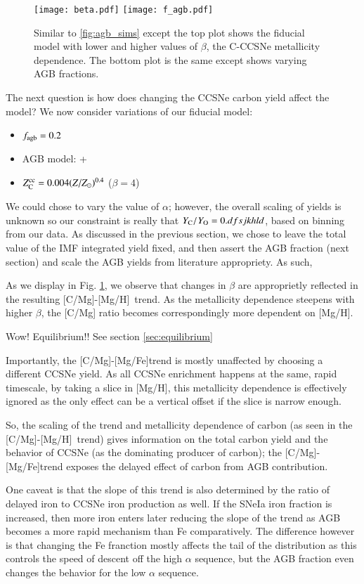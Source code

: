\documentclass[12pt,oneside]{report}
\newcommand{\cristallo}{\citetalias{cristallo+11}+\citetalias{cristallo+15}}
\newcommand{\caah}{[C/Mg]-[Mg/H]}
\newcommand{\caafe}{[C/Mg]-[Mg/Fe]}
\newcommand{\sun}{\ensuremath{\odot}}
\begin{document}
\begin{figure}\label{fig:beta_f}
\centering
\texttt{[image: beta.pdf]}
\texttt{[image: f\_agb.pdf]}

\caption[Adjusted yield models]{Similar to \ref{fig:agb_sims} except the top plot shows the fiducial model with lower and higher values of $\beta$, the C-CCSNe metallicity dependence. The bottom plot is the same except shows varying AGB fractions.}
\end{figure}

The next question is how does changing the CCSNe carbon yield affect the model?
We now consider variations of our fiducial model:
\begin{itemize}
    \item $f_{\rm agb} = 0.2$
    \item AGB model: \cristallo
    \item $Z_{\rm C}^{\rm cc} = 0.004 (Z/Z_{\sun })^{0.4}$ ($\beta = 4$)
\end{itemize}

We could chose to vary the value of $\alpha$; however, the overall scaling of
yields is unknown so our constraint is really that $Y_{\rm C}/Y_{\rm O} =
0.dfsjkhld$, based on binning from our data. As discussed in the previous
section, we chose to leave the total value of the IMF integrated yield fixed,
and then assert the AGB fraction (next section) and scale the AGB yields from
literature appropriety. As such, 

As we display in Fig. \ref{fig:beta_f}, we observe that changes in $\beta$ are
approprietly reflected in the resulting \caah~trend. As the metallicity
dependence steepens with higher $\beta$, the [C/Mg] ratio becomes
correspondingly more dependent on [Mg/H].

Wow! Equilibrium!! See section \ref{sec:equilibrium}

Importantly, the \caafe trend is mostly unaffected by choosing a different
CCSNe yield. As all CCSNe enrichment happens at the same, rapid timescale, by
taking a slice in [Mg/H], this metallicity dependence is effectively ignored as
the only effect can be a vertical offset if the slice is narrow enough. 

So, the scaling of the trend and metallicity dependence of carbon (as seen in
the \caah~trend) gives information on the total carbon yield and the behavior
of CCSNe (as the dominating producer of carbon);
the \caafe trend exposes the delayed effect of carbon from AGB contribution.

One caveat is that the slope of this trend is also determined by the ratio of delayed iron to CCSNe iron production as well. If the SNeIa iron fraction is increased, then more iron enters later reducing the slope of the trend as AGB becomes a more rapid mechanism than Fe comparatively. The difference however is that changing the Fe franction mostly affects the tail of the distribution as this controls the speed of descent off the high $\alpha$ sequence, but the AGB fraction even changes the behavior for the low $\alpha$ sequence.
\end{document}
